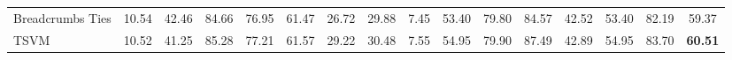 \begin{table*}
{\begin{tabular}{lcccccccc|c|cc|cccc}
            Breadcrumbs Ties                  & 10.54                                     & 42.46            & 84.66                                      & 76.95                                  & 61.47                                 & 26.72                                   & 29.88                         & 7.45     & 53.40           & 79.80           & 84.57       & 42.52 & 53.40 & 82.19 & 59.37             \\
            TSVM                              & 10.52                                     & 41.25            & 85.28                                      & 77.21                                  & 61.57                                 & 29.22                                   & 30.48                         & 7.55     & 54.95           & 79.90           & 87.49       & 42.89 & 54.95 & 83.70 & \textbf{60.51}    \\


            \bottomrule
        \end{tabular}
    }
\end{table*}

